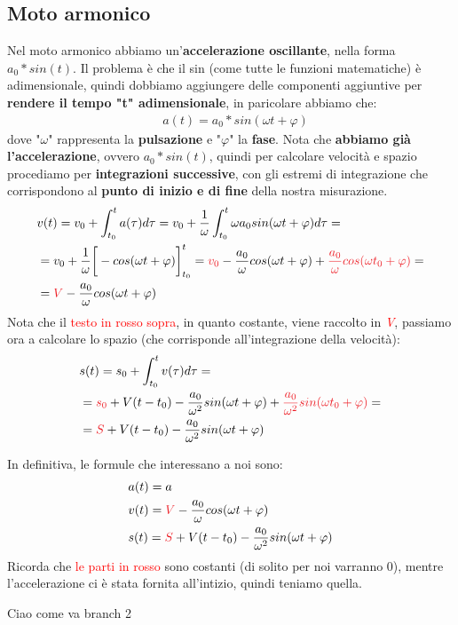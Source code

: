 		\subsection{Moto armonico}
			Nel moto armonico abbiamo un'\textbf{accelerazione oscillante}, nella forma \underline{$a_0*sin(t)$}. Il problema è che il sin (come tutte le funzioni matematiche) è adimensionale, quindi dobbiamo aggiungere delle componenti aggiuntive per \textbf{rendere il tempo "t" adimensionale}, in paricolare abbiamo che:
			\begin{align*}
				&a(t) = a_0 * sin(\omega t + \varphi)
			\end{align*}
			dove "$\omega$" rappresenta la \textbf{pulsazione} e "$\varphi$" la \textbf{fase}. Nota che \textbf{abbiamo già l'accelerazione}, ovvero $a_0*sin(t)$, quindi per calcolare velocità e spazio procediamo per \textbf{integrazioni successive}, con gli estremi di integrazione che corrispondono al \textbf{punto di inizio e di fine} della nostra misurazione.
			\begin{align*}
				&v(t)= v_0 +\int_{t_0}^ta(\tau) d\tau = v_0 + \frac{1}{\omega} \int_{t_0}^t \omega a_0 sin(\omega t+\varphi)d\tau=\\
				&=v_0 + \frac{1}{\omega} \bigg[-cos(\omega t+\varphi)\bigg]_{t_0}^t=\textcolor{Red}{v_0} - \frac{a_0}{\omega} cos(\omega t+\varphi) + \textcolor{Red}{\frac{a_0}{\omega} cos(\omega t_0+\varphi)}=\\
				&=\textcolor{Red}{V}-\frac{a_0}{\omega} cos(\omega t+\varphi)
			\end{align*}
			Nota che il \textcolor{Red}{testo in rosso sopra}, in quanto costante, viene raccolto in \textit{\textcolor{Red}{V}}, passiamo ora a calcolare lo spazio (che corrisponde all'integrazione della velocità):
			\begin{align*}
				&s(t)= s_0 +\int_{t_0}^tv(\tau) d\tau =\\
				&=\textcolor{Red}{s_0} + V(t-t_0) - \frac{a_0}{\omega^2} sin(\omega t+\varphi) + \textcolor{Red}{\frac{a_0}{\omega^2} sin(\omega t_0+\varphi)}=\\
				&=\textcolor{Red}{S} + V(t-t_0) -\frac{a_0}{\omega^2} sin(\omega t+\varphi)
			\end{align*}

			In definitiva, le formule che interessano a noi sono:
			\begin{align*}
				&a(t)=a\\
				&v(t)=\textcolor{Red}{V}-\frac{a_0}{\omega} cos(\omega t+\varphi)\\
				&s(t)=\textcolor{Red}{S} + V(t-t_0) -\frac{a_0}{\omega^2} sin(\omega t+\varphi)\\
			\end{align*}
			Ricorda che \textcolor{Red}{le parti in rosso} sono costanti (di solito per noi varranno 0), mentre l'accelerazione ci è stata fornita all'intizio, quindi teniamo quella.

			Ciao come va branch 2
